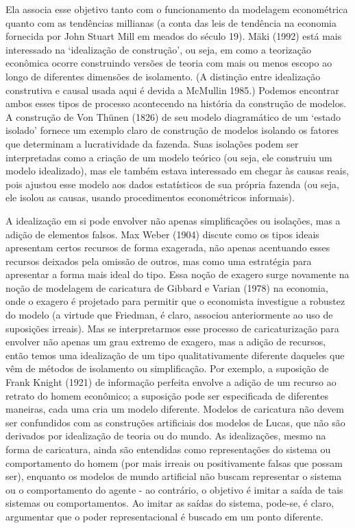 \documentclass[12pt]{article}
\begin{document}
Ela associa esse objetivo tanto com o funcionamento da modelagem econométrica quanto com as tendências millianas (a conta das leis de tendência na economia fornecida por John Stuart Mill em meados do século 19). Mäki (1992) está mais interessado na ‘idealização de construção’, ou seja, em como a teorização econômica ocorre construindo versões de teoria com mais ou menos escopo ao longo de diferentes dimensões de isolamento. (A distinção entre idealização construtiva e causal usada aqui é devida a McMullin 1985.) Podemos encontrar ambos esses tipos de processo acontecendo na história da construção de modelos. A construção de Von Thünen (1826) de seu modelo diagramático de um ‘estado isolado’ fornece um exemplo claro de construção de modelos isolando os fatores que determinam a lucratividade da fazenda. Suas isolações podem ser interpretadas como a criação de um modelo teórico (ou seja, ele construiu um modelo idealizado), mas ele também estava interessado em chegar às causas reais, pois ajustou esse modelo aos dados estatísticos de sua própria fazenda (ou seja, ele isolou as causas, usando procedimentos econométricos informais).

A idealização em si pode envolver não apenas simplificações ou isolações, mas a adição de elementos falsos. Max Weber (1904) discute como os tipos ideais apresentam certos recursos de forma exagerada, não apenas acentuando esses recursos deixados pela omissão de outros, mas como uma estratégia para apresentar a forma mais ideal do tipo. Essa noção de exagero surge novamente na noção de modelagem de caricatura de Gibbard e Varian (1978) na economia, onde o exagero é projetado para permitir que o economista investigue a robustez do modelo (a virtude que Friedman, é claro, associou anteriormente ao uso de suposições irreais). Mas se interpretarmos esse processo de caricaturização para envolver não apenas um grau extremo de exagero, mas a adição de recursos, então temos uma idealização de um tipo qualitativamente diferente daqueles que vêm de métodos de isolamento ou simplificação. Por exemplo, a suposição de Frank Knight (1921) de informação perfeita envolve a adição de um recurso ao retrato do homem econômico; a suposição pode ser especificada de diferentes maneiras, cada uma cria um modelo diferente. Modelos de caricatura não devem ser confundidos com as construções artificiais dos modelos de Lucas, que não são derivados por idealização de teoria ou do mundo. As idealizações, mesmo na forma de caricatura, ainda são entendidas como representações do sistema ou comportamento do homem (por mais irreais ou positivamente falsas que possam ser), enquanto os modelos de mundo artificial não buscam representar o sistema ou o comportamento do agente - ao contrário, o objetivo é imitar a saída de tais sistemas ou comportamentos. Ao imitar as saídas do sistema, pode-se, é claro, argumentar que o poder representacional é buscado em um ponto diferente.
\end{document}

